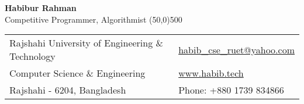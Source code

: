 \documentclass[letterpaper,11pt,oneside]{article}
\begin{document}
\center  \LARGE{\textbf{Habibur Rahman}} \\
\small{Competitive Programmer, Algorithmist}
\vspace{-4ex}
{\line(50,0){500}}
\normalsize
\begin{center}
\begin{tabular}{l l}
Rajshahi University of Engineering \& Technology    & \hspace{1.55in} \href{mailto:habib_cse_ruet@yahoo.com}{habib\_cse\_ruet@yahoo.com} \\
Computer Science \& Engineering    & \hspace{1.55in}  \href{www.habib.tech}{www.habib.tech}   \\        
Rajshahi - 6204, Bangladesh & \hspace{1.55in} Phone: +880 1739 834866 \\
\end{tabular}
\end{center}
\vspace{2.2ex}
\end{document}
